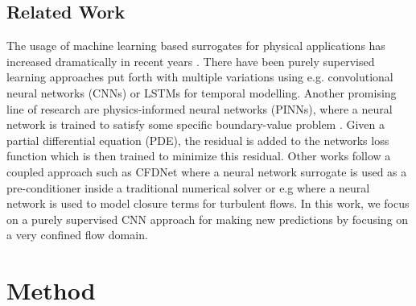 \documentclass{article} %
\begin{document}
\subsection*{Related Work}
The usage of machine learning based surrogates for physical applications has increased dramatically in recent years \citep{Vinuesa2021,Chen2021,Zhu2019}.
There have been purely supervised learning approaches put forth \citep{nn_pde_data} with multiple variations using e.g. convolutional neural networks (CNNs) \citep{nn_pde_cnn, Thuerey2019} or LSTMs \citep{dl_lstm} for temporal modelling.
Another promising line of research are physics-informed neural networks (PINNs), where a neural network is trained to satisfy some specific boundary-value problem \citep{pinn,pinn_subsurface,pinn_hfm,pinn_pathologies,Gao2021}. 
Given a partial differential equation (PDE), the residual is added to the networks loss function which is then trained to minimize this residual.
Other works follow a coupled approach such as CFDNet \citep{cfdnet} where a neural network surrogate is used as a pre-conditioner inside a traditional numerical solver or e.g \citet{BECK2019108910} where a neural network is used to model closure terms for turbulent flows.
In this work, we focus on a purely supervised CNN approach for making new predictions by focusing on a very confined flow domain.


\section{Method}
\label{sec:method}


\end{document}
